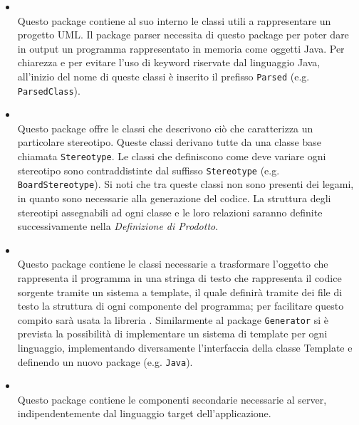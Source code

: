 \begin{itemize}
\begin{itemize}
\item \hyperref[\nogloxy{swedesigner::server::project}]{}\\
Questo package contiene al suo interno le classi utili a rappresentare un progetto UML. Il package parser necessita di questo package per poter dare in output un programma rappresentato in memoria come oggetti Java. Per chiarezza e per evitare l'uso di keyword riservate dal linguaggio Java, all'inizio del nome di queste classi è inserito il prefisso \texttt{Parsed} (e.g. \texttt{ParsedClass}).
\item \hyperref[\nogloxy{swedesigner::server::stereotype}]{}\\
Questo package offre le classi che descrivono ciò che caratterizza un particolare stereotipo. Queste classi derivano tutte da una classe base chiamata \texttt{Stereotype}. Le classi che definiscono come deve variare ogni stereotipo sono contraddistinte dal suffisso \texttt{Stereotype} (e.g. \texttt{BoardStereotype}). Si noti che tra queste classi non sono presenti dei legami, in quanto sono necessarie alla generazione del codice. La struttura degli stereotipi assegnabili ad ogni classe e le loro relazioni saranno definite successivamente nella \emph{Definizione di Prodotto}.
\item \hyperref[\nogloxy{swedesigner::server::template}]{}\\
Questo package contiene le classi necessarie a trasformare l'oggetto che rappresenta il programma in una stringa di testo che rappresenta il codice sorgente tramite un sistema a template, il quale definirà tramite dei file di testo la struttura di ogni componente del programma; per facilitare questo compito sarà usata la libreria \stringtemplate{}. Similarmente al package \texttt{Generator} si è prevista la possibilità di implementare un sistema di template per ogni linguaggio, implementando diversamente l'interfaccia della classe Template e definendo un nuovo package (e.g. \texttt{Java}).
\item \hyperref[\nogloxy{swedesigner::server::utility}]{}\\
Questo package contiene le componenti secondarie necessarie al server, indipendentemente dal linguaggio target dell'applicazione.
\end{itemize}
\end{itemize}

\subsection{}
\label{\nogloxy{swedesigner::server::compiler}}
